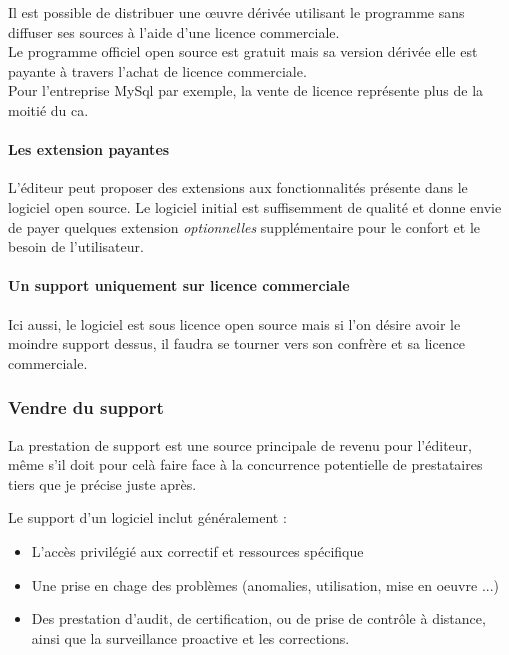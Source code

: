 					Il est possible de distribuer une œuvre dérivée utilisant le programme sans diffuser ses sources à l'aide d'une licence commerciale.\\
					Le programme officiel open source est gratuit mais sa version dérivée elle est payante à travers l'achat de licence commerciale.\\
					Pour l'entreprise MySql par exemple, la vente de licence représente plus de la moitié du \acrfull{ca}.

				\paragraph{Les extension payantes\\}

					L'éditeur peut proposer des extensions aux fonctionnalités présente dans le logiciel open source. Le logiciel initial est suffisemment de qualité et donne envie de payer quelques extension \textit{optionnelles} supplémentaire pour le confort et le besoin de l'utilisateur.

				\paragraph{Un support uniquement sur licence commerciale\\}

					Ici aussi, le logiciel est sous licence open source mais si l'on désire avoir le moindre support dessus, il faudra se tourner vers son confrère et sa licence commerciale.

			\subsubsection{Vendre du support}

				La prestation de support est une source principale de revenu pour l'éditeur, même s'il doit pour celà faire face à la concurrence potentielle de prestataires tiers que je précise juste après.

				Le support d'un logiciel inclut généralement :

				\begin{itemize}[label=\textbullet, font=\LARGE \color{burntorange}]
					\item L'accès privilégié aux correctif et ressources spécifique
					\item Une prise en chage des problèmes (anomalies, utilisation, mise en oeuvre ...)
					\item Des prestation d'audit, de certification, ou de prise de contrôle à distance, ainsi que la surveillance proactive et les corrections.
				\end{itemize}

